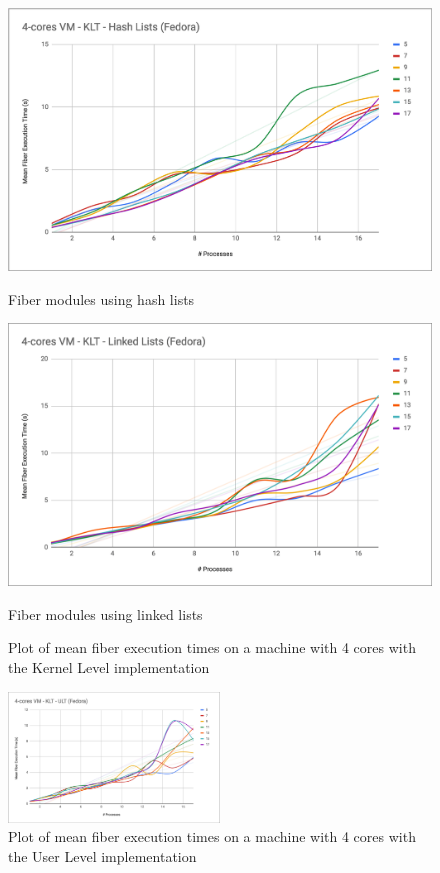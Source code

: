\documentclass[a4paper,10pt]{article}
\begin{document}
  \begin{figure}[htb!]
    \centering
    \begin{minipage}{0.45\textwidth}%
      \centering
      \includegraphics[width=\textwidth]{imgs/bench-4cores-hash}
      \caption{Fiber modules using hash lists}
      \label{fig:bench-4cores-hash}
    \end{minipage}%
    \qquad
    \begin{minipage}{0.45\textwidth}%
      \centering
      \includegraphics[width=\textwidth]{imgs/bench-4cores-linked}
      \caption{Fiber modules using linked lists}
      \label{fig:bench-4cores-linked}%
    \end{minipage}%
    \caption{Plot of mean fiber execution times on a machine with 4 cores with the Kernel Level implementation}
  \end{figure}

  \begin{figure}[htb!]
    \centering
    \includegraphics[width=0.5\textwidth]{imgs/bench-4cores-ult}
    \caption{Plot of mean fiber execution times on a machine with 4 cores with the User Level implementation}
    \label{fig:bench-4cores-ult}
  \end{figure}
\end{document}

